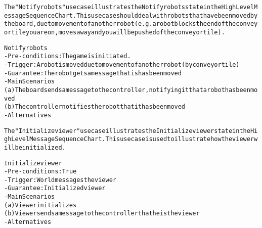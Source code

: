 \begin{alltt}
The "Notify robots" use case illustrates the Notify robots state in the High Level Message Sequence Chart. This use case should deal with robots that have been moved by the board, due to movement of another robot (e.g. a robot blocks the end of the conveyor tile you are on, moves away and you will be pushed of the conveyor tile).

Notify robots
- Pre-conditions: The game is initiated.
- Trigger: A robot is moved due to movement of another robot (by conveyor tile)
- Guarantee: The robot gets a message that is has been moved
-Main Scenarios
    (a) The board sends a message to the controller, notifying it that a robot has been moved
    (b) The controller notifies the robot that it has been moved
- Alternatives

The "Initialize viewer" use case illustrates the Initialize viewer state in the High Level Message Sequence Chart. This use case is used to illustrate how the viewer will be initialized.

Initialize viewer
- Pre-conditions: True
- Trigger: World messages the viewer
- Guarantee: Initialized viewer
-Main Scenarios
    (a) Viewer initializes
    (b) Viewer sends a message to the controller that he is the viewer
- Alternatives


\end{alltt}
